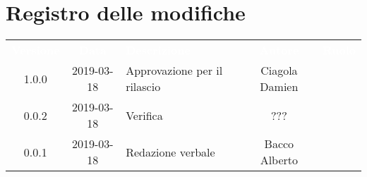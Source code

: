 \section*{Registro delle modifiche}
{
	\renewcommand{\arraystretch}{1.5}
	\centering
	\begin{longtable}{ c c  C{4cm}  c  c }
		
		\textcolor{white}{\textbf{Versione}} & \textcolor{white}{\textbf{Data}} & \textcolor{white}{\textbf{Descrizione}} & \textcolor{white}{\textbf{Autore}} & \textcolor{white}{\textbf{Ruolo}}\\
		1.0.0 & 2019-03-18 & Approvazione per il rilascio & Ciagola Damien & \Res{}\\
		0.0.2 & 2019-03-18 & Verifica & ??? & \ver{}\\
		0.0.1 & 2019-03-18 & Redazione verbale & Bacco Alberto & \reda{}\\
		
		
	\end{longtable}
	
}
